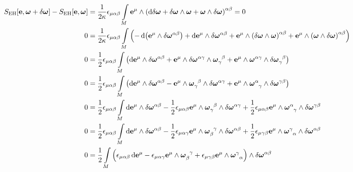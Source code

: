 \begin{align*}
    S_{\textnormal{EH}}\qty[\vb e,\boldsymbol\omega+\delta\boldsymbol\omega]-S_{\textnormal{EH}}\qty[\vb e,\boldsymbol\omega]&=\frac{1}{2\kappa}\epsilon_{\mu\alpha\beta}\int\limits_M\vb e^{\mu}\wedge\qty(\dd{\delta\boldsymbol\omega}+\delta\boldsymbol\omega\wedge\boldsymbol\omega+\boldsymbol\omega\wedge\delta\boldsymbol\omega)^{\alpha\beta}=0\\
    0&=\frac{1}{2\kappa}\epsilon_{\mu\alpha\beta}\int\limits_M\qty(-\dd{\qty(\vb e^\mu\wedge\delta\boldsymbol\omega^{\alpha\beta})}+\dd{\vb e^\mu}\wedge\delta\boldsymbol\omega^{\alpha\beta}+\vb e^\mu\wedge\qty(\delta\boldsymbol\omega\wedge\boldsymbol\omega)^{\alpha\beta}+\vb e^\mu\wedge\qty(\boldsymbol\omega\wedge\delta\boldsymbol\omega)^{\alpha\beta})\\
    0&=\frac{1}{2}\epsilon_{\mu\alpha\beta}\int\limits_M\qty(\dd{\vb e^\mu}\wedge\delta\boldsymbol\omega^{\alpha\beta}+\vb e^\mu\wedge\tensor{\delta\boldsymbol\omega}{^\alpha^\gamma}\wedge\tensor{\boldsymbol\omega}{_\gamma^\beta}+\vb e^\mu\wedge\tensor{\boldsymbol\omega}{^\alpha^\gamma}\wedge\tensor{\delta\boldsymbol\omega}{_\gamma^\beta})\\
    0&=\frac{1}{2}\epsilon_{\mu\alpha\beta}\int\limits_M\qty(\dd{\vb e^\mu}\wedge\delta\boldsymbol\omega^{\alpha\beta}-\vb e^\mu\wedge\tensor{\boldsymbol\omega}{_\gamma^\beta}\wedge\tensor{\delta\boldsymbol\omega}{^\alpha^\gamma}+\vb e^\mu\wedge\tensor{\boldsymbol\omega}{^\alpha_\gamma}\wedge\tensor{\delta\boldsymbol\omega}{^\gamma^\beta})\\
    0&=\frac{1}{2}\epsilon_{\mu\alpha\beta}\int\limits_M\dd{\vb e^\mu}\wedge\delta\boldsymbol\omega^{\alpha\beta}-\frac{1}{2}\epsilon_{\mu\alpha\beta}\vb e^\mu\wedge\tensor{\boldsymbol\omega}{_\gamma^\beta}\wedge\tensor{\delta\boldsymbol\omega}{^\alpha^\gamma}+\frac{1}{2}\epsilon_{\mu\alpha\beta}\vb e^\mu\wedge\tensor{\boldsymbol\omega}{^\alpha_\gamma}\wedge\tensor{\delta\boldsymbol\omega}{^\gamma^\beta}\\
    0&=\frac{1}{2}\epsilon_{\mu\alpha\beta}\int\limits_M\dd{\vb e^\mu}\wedge\delta\boldsymbol\omega^{\alpha\beta}-\frac{1}{2}\epsilon_{\mu\alpha\gamma}\vb e^\mu\wedge\tensor{\boldsymbol\omega}{_\beta^\gamma}\wedge\tensor{\delta\boldsymbol\omega}{^\alpha^\beta}+\frac{1}{2}\epsilon_{\mu\gamma\beta}\vb e^\mu\wedge\tensor{\boldsymbol\omega}{^\gamma_\alpha}\wedge\tensor{\delta\boldsymbol\omega}{^\alpha^\beta}\\
    0&=\frac{1}{2}\int\limits_M\qty(\epsilon_{\mu\alpha\beta}\dd{\vb e^\mu}-\epsilon_{\mu\alpha\gamma}\vb e^\mu\wedge\tensor{\boldsymbol\omega}{_\beta^\gamma}+\epsilon_{\mu\gamma\beta}\vb e^\mu\wedge\tensor{\boldsymbol\omega}{^\gamma_\alpha})\wedge\tensor{\delta\boldsymbol\omega}{^\alpha^\beta}\\

\end{align*}
